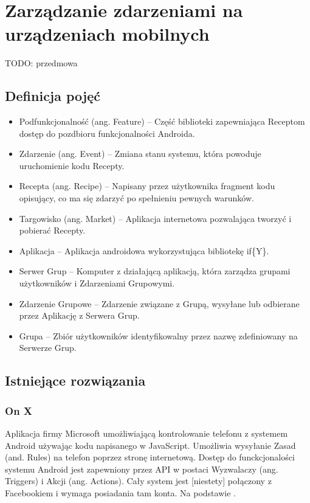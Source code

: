 \documentclass[11pt,a4paper,polish,thesis]{dcsbook}
\begin{document}
\chapter{Zarządzanie zdarzeniami na urządzeniach mobilnych}
TODO: przedmowa
\section{Definicja pojęć}
\begin{itemize}
\item Podfunkcjonalność (ang. Feature) -- Część biblioteki zapewniająca Receptom dostęp do pozdbioru funkcjonalności Androida.
\item Zdarzenie (ang. Event) -- Zmiana stanu systemu, która powoduje uruchomienie kodu Recepty.
\item Recepta (ang. Recipe) -- Napisany przez użytkownika fragment kodu opisujący, co ma się zdarzyć po spełnieniu pewnych warunków.
\item Targowisko (ang. Market) -- Aplikacja internetowa pozwalająca tworzyć i pobierać Recepty.
\item Aplikacja -- Aplikacja androidowa wykorzystująca bibliotekę if\{Y\}. 
\item Serwer Grup -- Komputer z działającą aplikacją, która zarządza grupami użytkowników i Zdarzeniami Grupowymi.
\item Zdarzenie Grupowe -- Zdarzenie związane z Grupą, wysyłane lub odbierane przez Aplikację z Serwera Grup.
\item Grupa -- Zbiór użytkowników identyfikowalny przez nazwę zdefiniowany na Serwerze Grup.
\end{itemize}
\section{Istniejące rozwiązania}
\subsection{On X}
Aplikacja firmy Microsoft umożliwiającą kontrolowanie telefonu z systemem Android używając kodu napisanego w JavaScript. Umożliwia wysyłanie Zasad (and. Rules) na
telefon poprzez stronę internetową. Dostęp do funckcjonalości systemu Android jest zapewniony przez API w postaci Wyzwalaczy (ang. Triggers) i Akcji (ang. Actions).
Cały system jest [niestety] połączony z Facebookiem i wymaga posiadania tam konta. Na podstawie \cite{onx}.
\end{document}

